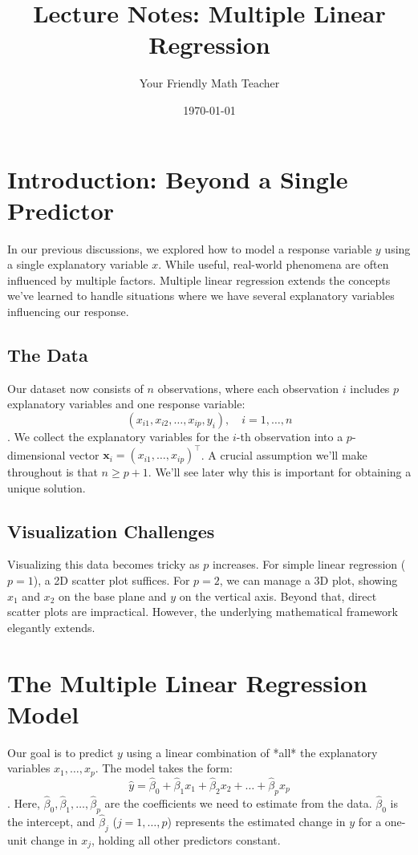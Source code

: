 \documentclass[11pt, letterpaper]{article}
\title{Lecture Notes: Multiple Linear Regression}
\author{Your Friendly Math Teacher}
\date{\today}
\theoremstyle{definition}
\newcommand{\vect}[1]{\mathbf{#1}} %
\begin{document}
\maketitle

\section{Introduction: Beyond a Single Predictor}

In our previous discussions, we explored how to model a response variable $y$ using a single explanatory variable $x$. While useful, real-world phenomena are often influenced by multiple factors. Multiple linear regression extends the concepts we've learned to handle situations where we have several explanatory variables influencing our response.

\subsection{The Data}

Our dataset now consists of $n$ observations, where each observation $i$ includes $p$ explanatory variables and one response variable:
\[
(x_{i1}, x_{i2}, \dots, x_{ip}, y_i), \quad i = 1, \dots, n
\]. We collect the explanatory variables for the $i$-th observation into a $p$-dimensional vector $\vect{x}_i = (x_{i1}, \dots, x_{ip})^{\top}$. A crucial assumption we'll make throughout is that $n \ge p+1$. We'll see later why this is important for obtaining a unique solution.

\subsection{Visualization Challenges}

Visualizing this data becomes tricky as $p$ increases. For simple linear regression ($p=1$), a 2D scatter plot suffices. For $p=2$, we can manage a 3D plot, showing $x_1$ and $x_2$ on the base plane and $y$ on the vertical axis. Beyond that, direct scatter plots are impractical. However, the underlying mathematical framework elegantly extends.

\section{The Multiple Linear Regression Model}

Our goal is to predict $y$ using a linear combination of *all* the explanatory variables $x_1, \dots, x_p$. The model takes the form:
\[
\hat{y} = \hat{\beta}_0 + \hat{\beta}_1 x_1 + \hat{\beta}_2 x_2 + \dots + \hat{\beta}_p x_p
\]. Here, $\hat{\beta}_0, \hat{\beta}_1, \dots, \hat{\beta}_p$ are the coefficients we need to estimate from the data. $\hat{\beta}_0$ is the intercept, and $\hat{\beta}_j$ ($j=1, \dots, p$) represents the estimated change in $y$ for a one-unit change in $x_j$, holding all other predictors constant.
\end{document}

